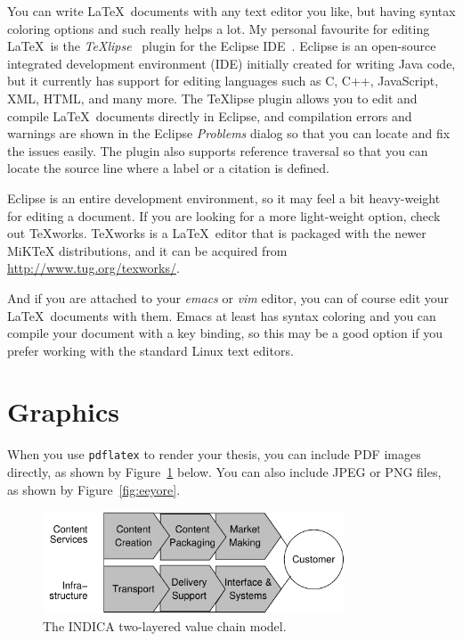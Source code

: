 You can write \LaTeX\ documents with any text editor you like, but having
syntax coloring options and such really helps a lot.
My personal favourite for editing \LaTeX\ is the
\emph{TeXlipse}~\cite{TeXlipse} plugin for the Eclipse IDE~\cite{Eclipse}. 
Eclipse is an open-source integrated development environment (IDE) initially
created for writing Java code, but it currently has support for editing
languages such as C, C++, JavaScript, XML, HTML, and many more. 
The TeXlipse plugin allows you to edit and compile \LaTeX\ documents directly
in Eclipse, and compilation errors and warnings are shown in the Eclipse
\emph{Problems} dialog so that you can locate and fix the issues easily.
The plugin also supports reference traversal so that you can locate the source
line where a label or a citation is defined.

Eclipse is an entire development environment, so it may feel a bit heavy-weight
for editing a document. 
If you are looking for a more light-weight option, check out TeXworks. 
TeXworks is a \LaTeX\ editor that is packaged with the newer MiKTeX
distributions, and it can be acquired from \url{http://www.tug.org/texworks/}.

And if you are attached to your \emph{emacs} or \emph{vim} editor, you
can of course edit your \LaTeX\ documents with them. 
Emacs at least has syntax coloring and you can compile your document with a key
binding, so this may be a good option if you prefer working with the standard
Linux text editors.

\section{Graphics}

When you use \texttt{pdflatex} to render your thesis, you can include
PDF images directly, as shown by Figure~\ref{fig:indica_model}
below. You can also include JPEG or PNG files, as shown by
Figure~\ref{fig:eeyore}.

\begin{figure}[ht]
  \begin{center}
    \includegraphics[width=0.80\textwidth]{images/indica_model.pdf} 
    \caption{The INDICA two-layered value chain model.}
    \label{fig:indica_model}
  \end{center}
\end{figure}


